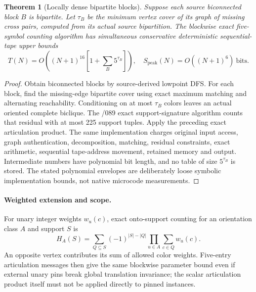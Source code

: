 \documentclass[11pt]{article}
\newtheorem{theorem}{Theorem}
\begin{document}
\begin{theorem}[Locally dense bipartite blocks]
Suppose each source biconnected block $B$ is bipartite.
Let $\tau_B$ be the minimum vertex cover of its graph of missing
cross pairs, computed from its actual source bipartition.
The blockwise exact five-symbol counting algorithm has simultaneous
conservative deterministic sequential-tape upper bounds
\[
\boxed{
T(N)=O\left((N+1)^{16}\left[1+\sum_B5^{\tau_B}\right]\right),
\quad S_{\mathrm{peak}}(N)=O((N+1)^6)\ \mathrm{bits}.
}
\]
\end{theorem}
\begin{proof}
Obtain biconnected blocks by source-derived lowpoint DFS.
For each block, find the missing-edge bipartite cover using exact
maximum matching and alternating reachability. Conditioning on at
most $\tau_B$ colors leaves an actual oriented complete biclique.
The /089 exact support-signature algorithm counts that residual
with at most 225 support tuples. Apply the preceding exact
articulation product. The same implementation charges original input
access, graph authentication, decomposition, matching, residual
constraints, exact arithmetic, sequential tape-address movement,
retained memory and output. Intermediate numbers have polynomial
bit length, and no table of size $5^{\tau_B}$ is stored. The stated
polynomial envelopes are deliberately loose symbolic implementation
bounds, not native microcode measurements.
\end{proof}
\paragraph{Weighted extension and scope.}
For unary integer weights $w_u(c)$, exact onto-support counting for
an orientation class $A$ and support $S$ is
\[
H_A(S)=\sum_{Q\subseteq S}(-1)^{|S|-|Q|}
\prod_{u\in A}\sum_{c\in Q}w_u(c).
\]
An opposite vertex contributes its sum of allowed color weights.
Five-entry articulation messages then give the same blockwise
parameter bound even if external unary pins break global
translation invariance; the scalar articulation product itself
must not be applied directly to pinned instances.
\end{document}
